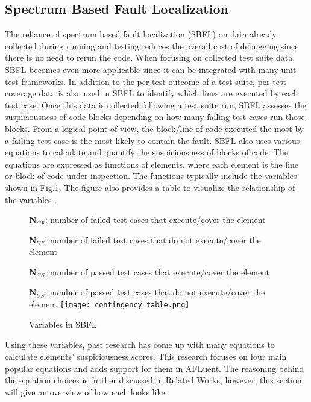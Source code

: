 \subsection{Spectrum Based Fault Localization}
\label{subsec:SpectrumBased}

The reliance of spectrum based fault localization (SBFL) on data already
collected during running and testing reduces the overall cost of debugging since
there is no need to rerun the code. When focusing on collected test suite data,
SBFL becomes even more applicable since it can be integrated with many unit test
frameworks. In addition to the per-test outcome of a test suite, per-test
coverage data is also used in SBFL to identify which lines are executed by each
test case. Once this data is collected following a test suite run, SBFL assesses
the suspiciousness of code blocks depending on how many failing test cases run
those blocks. From a logical point of view, the block/line of code executed the
most by a failing test case is the most likely to contain the fault. SBFL also
uses various equations to calculate and quantify the
suspiciousness of blocks of code. The equations are expressed as functions of
elements, where each element is the line or block of code under inspection. The
functions typically include the variables shown in
Fig.\ref{fig:contingency_table}. The figure also provides a table to visualize
the relationship of the variables \cite{Wong2014DStar}.

\begin{figure}[!htb]
	\begin{center}
		\textbf{N$_{CF}$}: number of failed test cases that execute/cover the element

		\textbf{N$_{UF}$}: number of failed test cases that do not execute/cover the element

		\textbf{N$_{CS}$}: number of passed test cases that execute/cover the element

		\textbf{N$_{US}$}: number of passed test cases that do not execute/cover the element
		\texttt{[image: contingency\_table.png]}
		\caption{\label{fig:contingency_table} Variables in SBFL}
	\end{center}
\end{figure}

Using these variables, past research has come up with many equations to
calculate elements' suspiciousness scores. This research focuses on four main
popular equations and adds support for them in AFLuent. The reasoning behind the
equation choices is further discussed in Related Works, however, this section
will give an overview of how each looks like.

